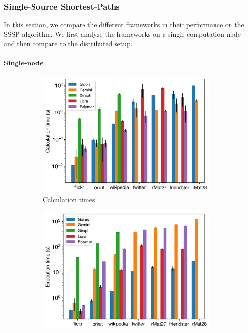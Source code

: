 

\subsubsection{Single-Source Shortest-Paths}
In this section, we compare the different frameworks in their performance on the SSSP algorithm. We first analyze the frameworks on a single computation node and then compare to the distributed setup.
\paragraph{Single-node}
\begin{figure}
	\begin{subfigure}{0.32\textwidth}
		\includegraphics[width=\linewidth]{../../plots/singleNodeSSSP_calcTime.png}
		\caption{Calculation times}
		\label{fig:singleNodeSSSP_calc}
	\end{subfigure}
	\hfil
	\begin{subfigure}{0.32\textwidth}
		\includegraphics[width=\linewidth]{../../plots/singleNodeSSSP_execTime.png}

\end{subfigure}
\end{figure}
